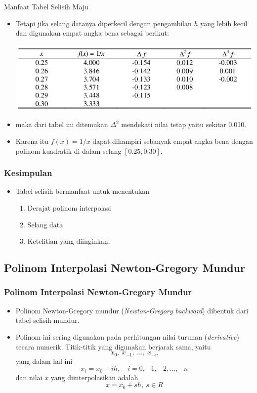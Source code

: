 \documentclass[pdflatex,compress,mathserif]{beamer}
\begin{document}
\begin{frame}{Manfaat Tabel Selisih Maju}
	\begin{itemize}
		\item Tetapi jika selang datanya diperkecil dengan pengambilan $ h $ yang lebih kecil dan digunakan empat angka bena sebagai berikut:
		\begin{center}
			\includegraphics[width=0.7\linewidth]{img/img25}
		\end{center}
		\item maka dari tabel ini ditemukan $\Delta^2$ mendekati nilai tetap yaitu sekitar 0.010.
		\item Karena itu $ f(x) = 1/x $ dapat dihampiri sebanyak empat angka bena dengan polinom kuadratik di dalam selang $ [0.25, 0.30] $.
	\end{itemize}
\end{frame}

\begin{frame}
	\frametitle{Kesimpulan}
	\begin{itemize}
		\item Tabel selisih bermanfaat untuk menentukan
		\begin{enumerate}
			\item Derajat polinom interpolasi
			\item Selang data
			\item Ketelitian yang diinginkan.
		\end{enumerate}
	\end{itemize}
\end{frame}

\subsection{Polinom Interpolasi Newton-Gregory Mundur}

\begin{frame}
	\frametitle{Polinom Interpolasi Newton-Gregory Mundur}
	\begin{itemize}
		\item Polinom Newton-Gregory mundur (\textit{Newton-Gregory backward}) dibentuk dari tabel selisih mundur.
		\item Polinom ini sering digunakan pada perhitungan nilai turunan (\textit{derivative}) secara numerik. Titik-titik yang digunakan berjarak sama, yaitu
		\[ x_0,~x_{-1},~\dots,~x_{-n} \] yang dalam hal ini \[ x_i = x_0 + ih,\quad i = 0, -1, -2,\dots,-n \] dan nilai $ x $ yang diinterpolasikan adalah \[ x = x_0 + sh,~ s \in R \]
	\end{itemize}
\end{frame}
\end{document}
